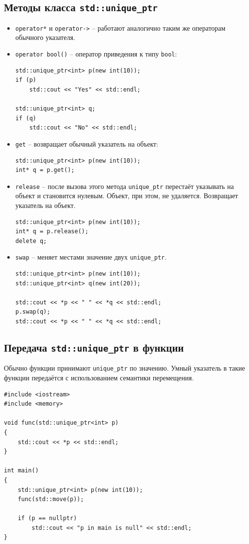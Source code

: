 \documentclass{article}
\begin{document}
\newpage
\subsection*{Методы класса \texttt{std::unique\_ptr}}
\begin{itemize}
\item \texttt{operator*} и \texttt{operator->} -- работают аналогично таким же операторам обычного указателя.

\item \texttt{operator bool()} -- оператор приведения к типу \texttt{bool}:
\begin{lstlisting}
std::unique_ptr<int> p(new int(10));
if (p) 
	std::cout << "Yes" << std::endl;
	
std::unique_ptr<int> q;
if (q) 
	std::cout << "No" << std::endl;
\end{lstlisting}


\item \texttt{get} -- возвращает обычный указатель на объект:
\begin{lstlisting}
std::unique_ptr<int> p(new int(10));
int* q = p.get();
\end{lstlisting}

\item \texttt{release} -- после вызова этого метода \texttt{unique\_ptr} перестаёт указывать на объект и становится нулевым. Объект, при этом, не удаляется. Возвращает указатель на объект.
\begin{lstlisting}
std::unique_ptr<int> p(new int(10));
int* q = p.release();
delete q;
\end{lstlisting}

\item \texttt{swap} -- меняет местами значение двух \texttt{unique\_ptr}.
\begin{lstlisting}
std::unique_ptr<int> p(new int(10));
std::unique_ptr<int> q(new int(20));

std::cout << *p << " " << *q << std::endl; 
p.swap(q);
std::cout << *p << " " << *q << std::endl; 
\end{lstlisting}
\end{itemize}

\subsection*{Передача \texttt{std::unique\_ptr} в функции}
Обычно функции принимают \texttt{unique\_ptr} по значению. Умный указатель в такие функции передаётся с использованием семантики перемещения.
\begin{lstlisting}
#include <iostream>
#include <memory>

void func(std::unique_ptr<int> p)
{
	std::cout << *p << std::endl;
}

int main()
{
	std::unique_ptr<int> p(new int(10));
	func(std::move(p));
	
	if (p == nullptr)
		std::cout << "p in main is null" << std::endl;
}
\end{lstlisting}
\end{document}

